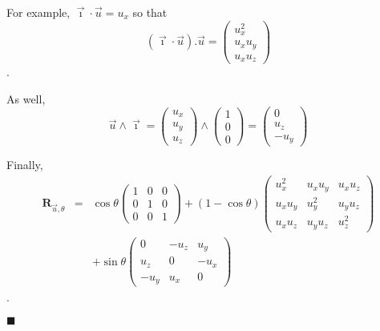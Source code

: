 \documentclass[10pt,a4paper]{article}
\newcommand{\ivec}{\vec{\imath}}
\newcommand{\uvec}{\vec{u}}
\newcommand{\matrot}{\bm{R}_{\vec{u}, \theta}}
\begin{document}
For example, $\ivec \cdot \uvec = u_x$
so that
\[ (\ivec \cdot \uvec).\uvec = 
\begin{pmatrix}
u_x^2 \\ u_x u_y \\ u_x u_z
\end{pmatrix}
\].

As well,
\[
\uvec \wedge \ivec =
\begin{pmatrix}
u_x \\ u_y \\ u_z
\end{pmatrix}
\wedge
\begin{pmatrix}
1 \\ 0 \\ 0
\end{pmatrix}
=
\begin{pmatrix}
0 \\ u_z \\ -u_y
\end{pmatrix}
\]

Finally,
\begin{eqnarray*}
\matrot & = & \cos\theta
\begin{pmatrix}
1 & 0 & 0 \\
0 & 1 & 0 \\
0 & 0 & 1
\end{pmatrix}
+ (1 - \cos\theta)
\begin{pmatrix}
u_x^2 & u_x u_y & u_x u_z \\
u_x u_y & u_y^2 & u_y u_z \\
u_x u_z & u_y u_z & u_z^2
\end{pmatrix} \\
& & + \sin\theta
\begin{pmatrix}
0 & -u_z & u_y \\
u_z & 0 & -u_x \\
-u_y & u_x & 0
\end{pmatrix}
\end{eqnarray*}.

\hfill$\blacksquare$
\end{document}
